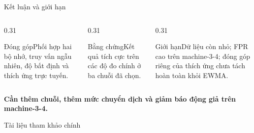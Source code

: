 \documentclass[aspectratio=169]{beamer}
\begin{document}
\begin{frame}{Kết luận và giới hạn}
  \begin{columns}[T,onlytextwidth]
    \begin{column}{0.31\textwidth}\begin{exampleblock}{Đóng góp}\small Phối hợp hai bộ nhớ, truy vấn ngẫu nhiên, độ bất định và thích ứng trực tuyến.\end{exampleblock}\end{column}
    \begin{column}{0.31\textwidth}\begin{exampleblock}{Bằng chứng}\small Kết quả tích cực trên các độ đo chính ở ba chuỗi đã chọn.\end{exampleblock}\end{column}
    \begin{column}{0.31\textwidth}\begin{alertblock}{Giới hạn}\small Dữ liệu còn nhỏ; FPR cao trên machine-3-4; đóng góp riêng của thích ứng chưa tách hoàn toàn khỏi EWMA.\end{alertblock}\end{column}
  \end{columns}
  \vspace{0.3em}\begin{center}\textbf{Cần thêm chuỗi, thêm mức chuyển dịch và giảm báo động giả trên machine-3-4.}\end{center}
\end{frame}

\begin{frame}[allowframebreaks]{Tài liệu tham khảo chính}
  \scriptsize
  
  
\end{frame}
\end{document}
